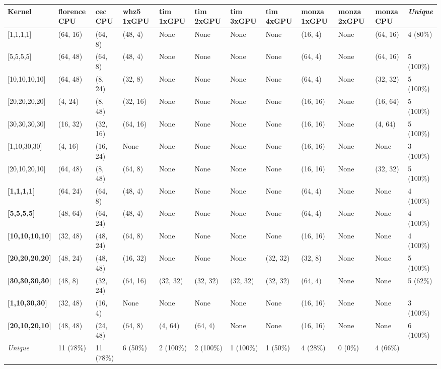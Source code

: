 \begin{tabular}{|p{1.8cm} | p{1cm} | p{1cm} | p{1cm} | p{1cm} | p{1cm} | p{1cm} | p{1cm} | p{1cm} | p{1cm} | p{1cm} | p{1.1cm}|}
\hline
\textbf{Kernel} & \textbf{florence CPU} & \textbf{cec CPU} & \textbf{whz5 1xGPU} & \textbf{tim 1xGPU} & \textbf{tim 2xGPU} & \textbf{tim 3xGPU} & \textbf{tim 4xGPU} & \textbf{monza 1xGPU} & \textbf{monza 2xGPU} & \textbf{monza CPU} & \textit{Unique}\\
\hline
{[}1,1,1,1{]} & (64, 16) & (64, 8) & (48, 4) & None & None & None & None & (16, 4) & None & (64, 16) & 4 (80\%)\\
{[}5,5,5,5{]} & (64, 48) & (64, 8) & (48, 4) & None & None & None & None & (64, 4) & None & (64, 16) & 5 (100\%)\\
{[}10,10,10,10{]} & (64, 48) & (8, 24) & (32, 8) & None & None & None & None & (64, 4) & None & (32, 32) & 5 (100\%)\\
{[}20,20,20,20{]} & (4, 24) & (8, 48) & (32, 16) & None & None & None & None & (16, 16) & None & (16, 64) & 5 (100\%)\\
{[}30,30,30,30{]} & (16, 32) & (32, 16) & (64, 16) & None & None & None & None & (16, 16) & None & (4, 64) & 5 (100\%)\\
{[}1,10,30,30{]} & (4, 16) & (16, 24) & None & None & None & None & None & (16, 16) & None & None & 3 (100\%)\\
{[}20,10,20,10{]} & (64, 48) & (8, 48) & (64, 8) & None & None & None & None & (16, 16) & None & (32, 32) & 5 (100\%)\\
\textbf{{[}1,1,1,1{]}} & (64, 24) & (64, 8) & (48, 4) & None & None & None & None & (64, 4) & None & None & 4 (100\%)\\
\textbf{{[}5,5,5,5{]}} & (48, 64) & (64, 24) & (48, 4) & None & None & None & None & (64, 4) & None & None & 4 (100\%)\\
\textbf{{[}10,10,10,10{]}} & (32, 48) & (48, 24) & (64, 8) & None & None & None & None & (16, 16) & None & None & 4 (100\%)\\
\textbf{{[}20,20,20,20{]}} & (48, 24) & (48, 48) & (16, 32) & None & None & None & (32, 32) & (32, 8) & None & None & 5 (100\%)\\
\textbf{{[}30,30,30,30{]}} & (48, 8) & (32, 24) & (64, 16) & (32, 32) & (32, 32) & (32, 32) & (32, 32) & (64, 4) & None & None & 5 (62\%)\\
\textbf{{[}1,10,30,30{]}} & (32, 48) & (16, 4) & None & None & None & None & None & (16, 16) & None & None & 3 (100\%)\\
\textbf{{[}20,10,20,10{]}} & (48, 48) & (24, 48) & (64, 8) & (4, 64) & (64, 4) & None & None & (16, 16) & None & None & 6 (100\%)\\
\hline
\textit{Unique} & 11 (78\%) & 11 (78\%) & 6 (50\%) & 2 (100\%) & 2 (100\%) & 1 (100\%) & 1 (50\%) & 4 (28\%) & 0 (0\%) & 4 (66\%) & \\
\hline
\end{tabular}
